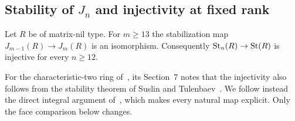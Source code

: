 \subsection{Stability of \texorpdfstring{$J_n$}{J\_n} and injectivity at fixed rank}

\begin{theorem}\label{thm:stability}
Let $R$ be of matrix-nil type. For $m\geq13$ the stabilization map $J_{m-1}(R)\to J_m(R)$ is an isomorphism.
Consequently $\operatorname{St}_n(R)\to\operatorname{St}(R)$ is injective for every $n\geq12$.
\end{theorem}

For the characteristic-two ring of~\cite{OAI247rf}, its Section~7 notes that the injectivity also follows from the
stability theorem of Suslin and Tulenbaev~\cite{SuslinTulenbaev1976}. We follow instead the direct integral argument
of~\cite[Section~7]{OAI247rf}, which makes every natural map explicit. Only the face comparison below changes.

